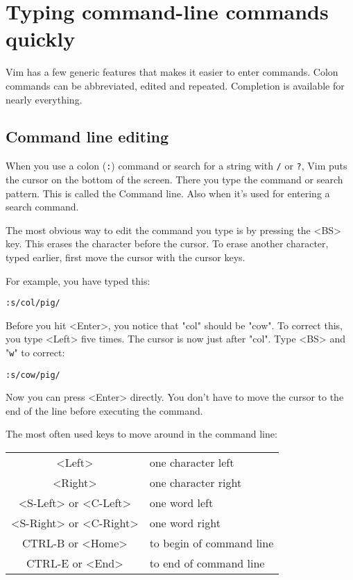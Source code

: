 \section{Typing command-line commands quickly}
Vim has a few generic features that makes it easier to enter commands.  Colon
commands can be abbreviated, edited and repeated.  Completion is available for
nearly everything.
\subsection{Command line editing}
When you use a colon (\verb!:!) command or search for a string with \verb!/! or \verb!?!, Vim puts the cursor on the bottom of the screen.
There you type the command or search pattern.
This is called the Command line.
Also when it's used for entering a search command.

The most obvious way to edit the command you type is by pressing the <BS> key.
This erases the character before the cursor.
To erase another character, typed earlier, first move the cursor with the cursor keys.

For example, you have typed this:

\begin{Verbatim}[samepage=true]
 :s/col/pig/
\end{Verbatim}

Before you hit <Enter>, you notice that "col" should be "cow".
To correct this, you type <Left> five times.
The cursor is now just after "col".
Type <BS> and "\verb!w!" to correct:

\begin{Verbatim}[samepage=true]
 :s/cow/pig/
\end{Verbatim}

Now you can press <Enter> directly.
You don't have to move the cursor to the end of the line before executing the command.

The most often used keys to move around in the command line:

\begin{center} \begin{longtable}{c l}
				<Left> & one character left \\
				<Right> & one character right\\
				<S-Left> or <C-Left> & one word left\\
				<S-Right> or <C-Right> & one word right\\
				CTRL-B or <Home> & to begin of command line\\
				CTRL-E or <End> & to end of command line\\
\end{longtable} \end{center}

